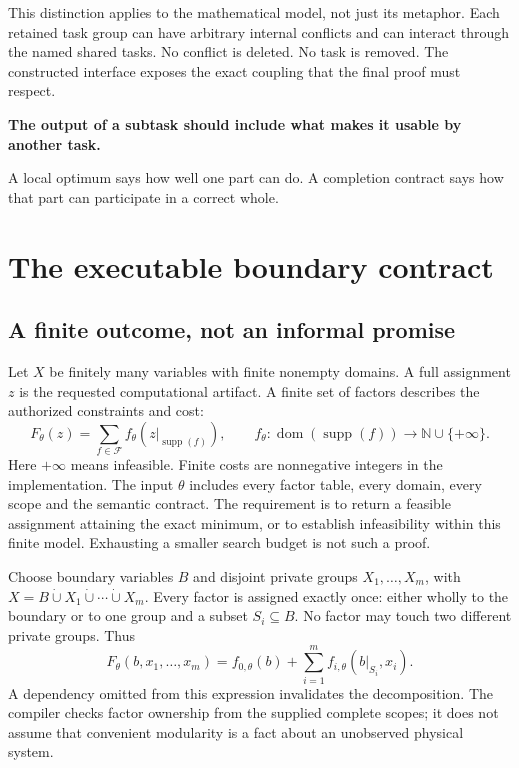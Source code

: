 \documentclass[11pt,letterpaper]{article}
\theoremstyle{definition}\newtheorem{definition}[theorem]{Definition}
\theoremstyle{remark}\newtheorem{remark}[theorem]{Remark}
\newcommand{\NN}{\mathbb N}\newcommand{\RR}{\mathbb R}
\newcommand{\dom}{\operatorname{dom}}\newcommand{\supp}{\operatorname{supp}}
\begin{document}
This distinction applies to the mathematical model, not just its metaphor. Each retained task group can have arbitrary internal conflicts and can interact through the named shared tasks. No conflict is deleted. No task is removed. The constructed interface exposes the exact coupling that the final proof must respect.

\begin{thesis}
\textbf{The output of a subtask should include what makes it usable by another task.}\par\smallskip
A local optimum says how well one part can do. A completion contract says how that part can participate in a correct whole.
\end{thesis}

\section{The executable boundary contract}
\label{sec:model}
\subsection{A finite outcome, not an informal promise}
Let $X$ be finitely many variables with finite nonempty domains. A full assignment $z$ is the requested computational artifact. A finite set of factors describes the authorized constraints and cost:
\begin{equation}
 F_\theta(z)=\sum_{f\in\mathcal F} f_\theta(z|_{\supp(f)}),
 \qquad f_\theta:\dom(\supp(f))\to\NN\cup\{+\infty\}.
 \label{eq:factor}
\end{equation}
Here $+\infty$ means infeasible. Finite costs are nonnegative integers in the implementation. The input $\theta$ includes every factor table, every domain, every scope and the semantic contract. The requirement is to return a feasible assignment attaining the exact minimum, or to establish infeasibility within this finite model. Exhausting a smaller search budget is not such a proof.

Choose boundary variables $B$ and disjoint private groups $X_1,\ldots,X_m$, with $X=B\mathbin{\dot\cup}X_1\mathbin{\dot\cup}\cdots\mathbin{\dot\cup}X_m$. Every factor is assigned exactly once: either wholly to the boundary or to one group and a subset $S_i\subseteq B$. No factor may touch two different private groups. Thus
\begin{equation}
 F_\theta(b,x_1,\ldots,x_m)
 =f_{0,\theta}(b)+\sum_{i=1}^{m}f_{i,\theta}(b|_{S_i},x_i).
 \label{eq:decomp}
\end{equation}
A dependency omitted from this expression invalidates the decomposition. The compiler checks factor ownership from the supplied complete scopes; it does not assume that convenient modularity is a fact about an unobserved physical system.
\end{document}

